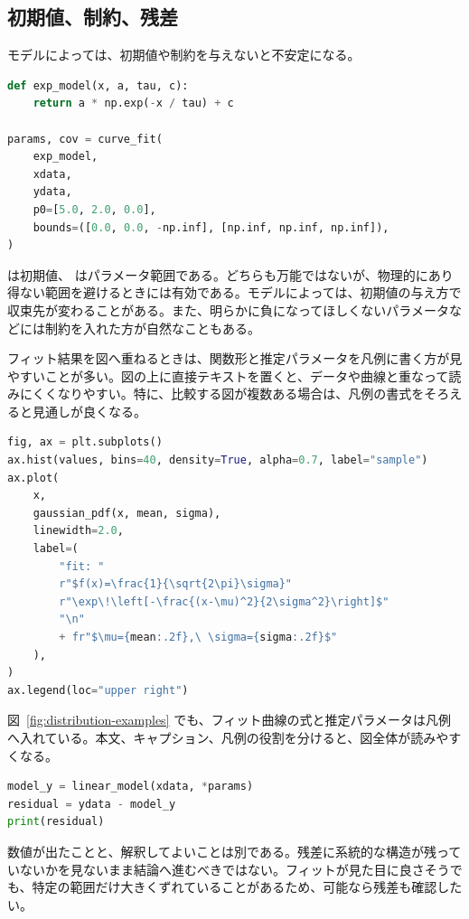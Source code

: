 \subsection{初期値、制約、残差}

モデルによっては、初期値や制約を与えないと不安定になる。

\begin{lstlisting}[language=Python]
def exp_model(x, a, tau, c):
    return a * np.exp(-x / tau) + c

params, cov = curve_fit(
    exp_model,
    xdata,
    ydata,
    p0=[5.0, 2.0, 0.0],
    bounds=([0.0, 0.0, -np.inf], [np.inf, np.inf, np.inf]),
)
\end{lstlisting}

 は初期値、 はパラメータ範囲である。どちらも万能ではないが、物理的にあり得ない範囲を避けるときには有効である。モデルによっては、初期値の与え方で収束先が変わることがある。また、明らかに負になってほしくないパラメータなどには制約を入れた方が自然なこともある。

フィット結果を図へ重ねるときは、関数形と推定パラメータを凡例に書く方が見やすいことが多い。図の上に直接テキストを置くと、データや曲線と重なって読みにくくなりやすい。特に、比較する図が複数ある場合は、凡例の書式をそろえると見通しが良くなる。

\begin{lstlisting}[language=Python]
fig, ax = plt.subplots()
ax.hist(values, bins=40, density=True, alpha=0.7, label="sample")
ax.plot(
    x,
    gaussian_pdf(x, mean, sigma),
    linewidth=2.0,
    label=(
        "fit: "
        r"$f(x)=\frac{1}{\sqrt{2\pi}\sigma}"
        r"\exp\!\left[-\frac{(x-\mu)^2}{2\sigma^2}\right]$"
        "\n"
        + fr"$\mu={mean:.2f},\ \sigma={sigma:.2f}$"
    ),
)
ax.legend(loc="upper right")
\end{lstlisting}

図~\ref{fig:distribution-examples} でも、フィット曲線の式と推定パラメータは凡例へ入れている。本文、キャプション、凡例の役割を分けると、図全体が読みやすくなる。

\begin{lstlisting}[language=Python]
model_y = linear_model(xdata, *params)
residual = ydata - model_y
print(residual)
\end{lstlisting}

数値が出たことと、解釈してよいことは別である。残差に系統的な構造が残っていないかを見ないまま結論へ進むべきではない。フィットが見た目に良さそうでも、特定の範囲だけ大きくずれていることがあるため、可能なら残差も確認したい。

